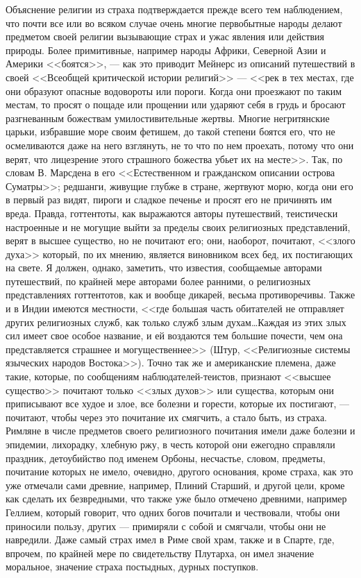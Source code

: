 \documentclass[12pt]{article}
\begin{document}
Объяснение религии из страха подтверждается прежде всего тем наблюдением, что почти все или во всяком случае очень многие первобытные народы делают предметом своей религии вызывающие страх и ужас явления или действия природы. Более примитивные, например народы Африки, Северной Азии и Америки <<боятся>>, --- как это приводит Мейнерс из описаний путешествий в своей <<Всеобщей критической истории религий>> --- <<рек в тех местах, где они образуют опасные водовороты или пороги. Когда они проезжают по таким местам, то просят о пощаде или прощении или ударяют себя в грудь и бросают разгневанным божествам умилостивительные жертвы. Многие негритянские царьки, избравшие море своим фетишем, до такой степени боятся его, что не осмеливаются даже на него взглянуть, не то что по нем проехать, потому что они верят, что лицезрение этого страшного божества убьет их на месте>>. Так, по словам В. Марсдена в его <<Естественном и гражданском описании острова Суматры>>; редшанги, живущие глубже в стране, жертвуют морю, когда они его в первый раз видят, пироги и сладкое печенье и просят его не причинять им вреда. Правда, готтентоты, как выражаются авторы путешествий, теистически настроенные и не могущие выйти за пределы своих религиозных представлений, верят в высшее существо, но не почитают его; они, наоборот, почитают, <<злого духа>>  который, по их мнению, является виновником всех бед, их постигающих на свете. Я должен, однако, заметить, что известия, сообщаемые авторами путешествий, по крайней мере авторами более ранними, о религиозных представлениях готтентотов, как и вообще дикарей, весьма противоречивы. Также и в Индии имеются местности, <<где большая часть обитателей не отправляет других религиозных служб, как только служб злым духам\dots Каждая из этих злых сил имеет свое особое название, и ей воздаются тем большие почести, чем она представляется страшнее и могущественнее>> (Штур, <<Религиозные системы языческих народов Востока>>). Точно так же и американские племена, даже такие, которые, по сообщениям наблюдателей-теистов, признают <<высшее существо>>  почитают только <<злых духов>>  или существа, которым они приписывают все худое и злое, все болезни и горести, которые их постигают, --- почитают, чтобы через это почитание их смягчить, а стало быть, из страха. Римляне в числе предметов своего религиозного почитания имели даже болезни и эпидемии, лихорадку, хлебную ржу, в честь которой они ежегодно справляли праздник, детоубийство под именем Орбоны, несчастье, словом, предметы, почитание которых не имело, очевидно, другого основания, кроме страха, как это уже отмечали сами древние, например, Плиний Старший, и другой цели, кроме как сделать их безвредными, что также уже было отмечено древними, например Геллием, который говорит, что одних богов почитали и чествовали, чтобы они приносили пользу, других --- примиряли с собой и смягчали, чтобы они не навредили. Даже самый страх имел в Риме свой храм, также и в Спарте, где, впрочем, по крайней мере по свидетельству Плутарха, он имел значение моральное, значение страха постыдных, дурных поступков. 
\end{document}
